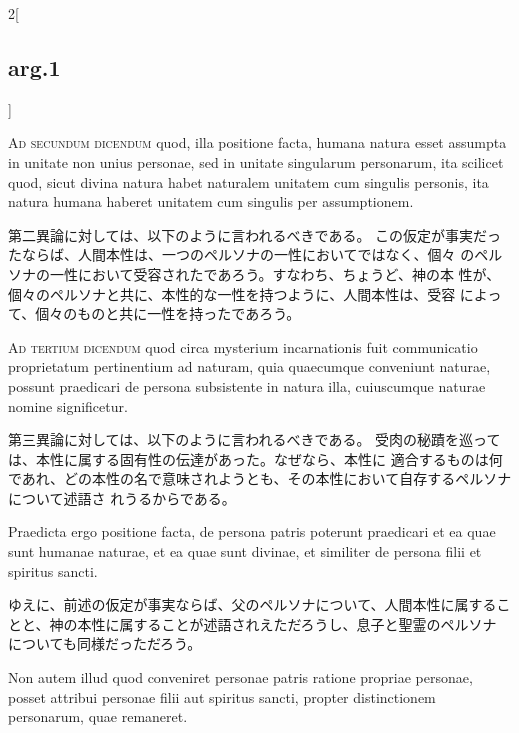\documentclass[paper=a4paper,fontsize=10pt,jafontsize=9pt,titlepage]{jlreq}
\begin{document}
\begin{paracol}{2}[\subsection{arg.1}]
\switchcolumn*[\subsection{ad.2}]

{\scshape Ad secundum dicendum} quod, illa positione facta, humana natura esset
assumpta in unitate non unius personae, sed in unitate singularum
personarum, ita scilicet quod, sicut divina natura habet naturalem
unitatem cum singulis personis, ita natura humana haberet unitatem cum
singulis per assumptionem.

\switchcolumn

第二異論に対しては、以下のように言われるべきである。
この仮定が事実だったならば、人間本性は、一つのペルソナの一性においてではなく、個々
 のペルソナの一性において受容されたであろう。すなわち、ちょうど、神の本
 性が、個々のペルソナと共に、本性的な一性を持つように、人間本性は、受容
 によって、個々のものと共に一性を持ったであろう。

\switchcolumn*[\subsection{ad.3}]

{\scshape Ad tertium dicendum} quod circa mysterium incarnationis fuit communicatio
proprietatum pertinentium ad naturam, quia quaecumque conveniunt
naturae, possunt praedicari de persona subsistente in natura illa,
cuiuscumque naturae nomine significetur.

\switchcolumn

第三異論に対しては、以下のように言われるべきである。
受肉の秘蹟を巡っては、本性に属する固有性の伝達があった。なぜなら、本性に
 適合するものは何であれ、どの本性の名で意味されようとも、その本性において自存するペルソナについて述語さ
 れうるからである。

\switchcolumn*

Praedicta ergo positione facta,
de persona patris poterunt praedicari et ea quae sunt humanae naturae,
et ea quae sunt divinae, et similiter de persona filii et spiritus
sancti.

\switchcolumn

ゆえに、前述の仮定が事実ならば、父のペルソナについて、人間本性に属するこ
 とと、神の本性に属することが述語されえただろうし、息子と聖霊のペルソナ
 についても同様だっただろう。

\switchcolumn*

Non autem illud quod conveniret personae patris ratione propriae
personae, posset attribui personae filii aut spiritus sancti, propter
distinctionem personarum, quae remaneret.


\end{paracol}
\end{document}
